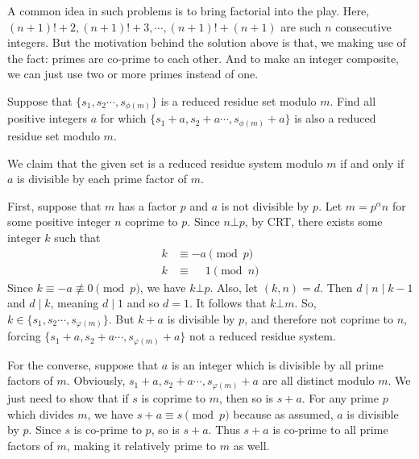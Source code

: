\documentclass{subfile}
\begin{document}
		\begin{note}
			A common idea in such problems is to bring factorial into the play. Here, $(n+1)!+2,(n+1)!+3,\cdots,(n+1)!+(n+1)$ are such $n$ consecutive integers. But the motivation behind the solution above is that, we making use of the fact: primes are co-prime to each other. And to make an integer composite, we can just use two or more primes instead of one.
		\end{note}

		\begin{problem}
			Suppose that $ \{s_1,s_2\cdots , s_{\phi(m)}\} $ is a reduced residue set modulo $m$. Find all positive integers $a$ for which $ \{s_1+a,s_2+a\cdots , s_{\phi(m)}+a\} $ is also a reduced residue set modulo $m$.
		\end{problem}

		\begin{solution}
			We claim that the given set is a reduced residue system modulo $m$ if and only if $a$ is divisible by each prime factor of $m$.

			First, suppose that $m$ has a factor $p$ and $a$ is not divisible by $p$. Let $m=p^{\alpha}n$ for some positive integer $n$ coprime to $p$. Since $n \bot p$, by CRT, there exists some integer $k$ such that
				\begin{align*}
					k &\equiv -a \pmod p\\
					k &\equiv \phantom{-}1  \pmod n
				\end{align*}
			Since $k \equiv -a \not \equiv 0 \pmod p$, we have $k \bot p$. Also, let $(k,n)=d$. Then $d\mid n\mid k-1$ and $d\mid k$, meaning $d\mid 1$ and so $d=1$. It follows that $k \bot m$. So, $k \in \{s_1,s_2\cdots , s_{\varphi(m)}\} $. But $k+a$ is divisible by $p$, and therefore not coprime to $n$, forcing $ \{s_1+a,s_2+a\cdots , s_{\varphi(m)}+a\} $ not a reduced residue system.

			For the converse, suppose that $a$ is an integer which is divisible by all prime factors of $m$. Obviously, $s_1+a,s_2+a\cdots , s_{\varphi(m)}+a$ are all distinct modulo $m$. We just need to show that if $s$ is coprime to $m$, then so is $s+a$. For any prime $p$ which divides $m$, we have $s+a \equiv s \pmod p$ because as assumed, $a$ is divisible by $p$. Since $s$ is co-prime to $p$, so is $s+a$. Thus $s+a$ is co-prime to all prime factors of $m$, making it relatively prime to $m$ as well.
		\end{solution}
\end{document}
